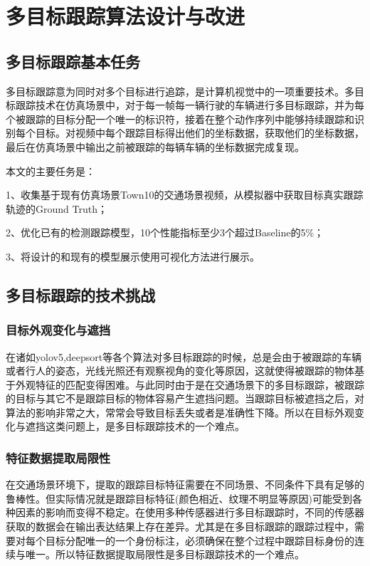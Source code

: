 \chapter{多目标跟踪算法设计与改进}

\section{多目标跟踪基本任务}
多目标跟踪意为同时对多个目标进行追踪，是计算机视觉中的一项重要技术。多目标跟踪技术在仿真场景中，对于每一帧每一辆行驶的车辆进行多目标跟踪，并为每个被跟踪的目标分配一个唯一的标识符，接着在整个动作序列中能够持续跟踪和识别每个目标。对视频中每个跟踪目标得出他们的坐标数据，获取他们的坐标数据，最后在仿真场景中输出之前被跟踪的每辆车辆的坐标数据完成复现。

本文的主要任务是：

1、收集基于现有仿真场景Town10的交通场景视频，从模拟器中获取目标真实跟踪轨迹的Ground Truth；

2、优化已有的检测跟踪模型，10个性能指标至少3个超过Baseline的5\%；

3、将设计的和现有的模型展示使用可视化方法进行展示。



\section{多目标跟踪的技术挑战}


\subsection{目标外观变化与遮挡}
在诸如yolov5,deepsort等各个算法对多目标跟踪的时候，总是会由于被跟踪的车辆或者行人的姿态，光线光照还有观察视角的变化等原因，这就使得被跟踪的物体基于外观特征的匹配变得困难。与此同时由于是在交通场景下的多目标跟踪，被跟踪的目标与其它不是跟踪目标的物体容易产生遮挡问题。当跟踪目标被遮挡之后，对算法的影响非常之大，常常会导致目标丢失或者是准确性下降。所以在目标外观变化与遮挡这类问题上，是多目标跟踪技术的一个难点。


\subsection{特征数据提取局限性}
在交通场景环境下，提取的跟踪目标特征需要在不同场景、不同条件下具有足够的鲁棒性。但实际情况就是跟踪目标特征(颜色相近、纹理不明显等原因)可能受到各种因素的影响而变得不稳定。在使用多种传感器进行多目标跟踪时，不同的传感器获取的数据会在输出表达结果上存在差异。尤其是在多目标跟踪的跟踪过程中，需要对每个目标分配唯一的一个身份标注，必须确保在整个过程中跟踪目标身份的连续与唯一。所以特征数据提取局限性是多目标跟踪技术的一个难点。

